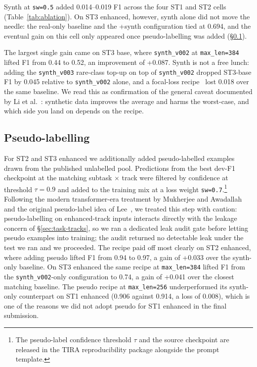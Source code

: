 Synth at \texttt{sw=0.5} added 0.014--0.019 F1 across the four ST1 and ST2 cells (Table~\ref{tab:ablation}). %
On ST3 enhanced, however, synth alone did not move the needle: the real-only baseline and the +synth configuration tied at 0.694, and the eventual gain on this cell only appeared once pseudo-labelling was added (\S\ref{sec:pseudo}). %

The largest single gain came on ST3 base, where \texttt{synth\_v002} at \texttt{max\_len=384} lifted F1 from 0.44 to 0.52, an improvement of +0.087. %
Synth is not a free lunch: adding the \texttt{synth\_v003} rare-class top-up on top of \texttt{synth\_v002} dropped ST3-base F1 by 0.045 relative to \texttt{synth\_v002} alone, and a focal-loss recipe~\cite{lin2017focal} lost 0.018 over the same baseline. %
We read this as confirmation of the general caveat documented by Li et al.~\cite{li2023synthdata}: synthetic data improves the average and harms the worst-case, and which side you land on depends on the recipe.

\subsection{Pseudo-labelling}
\label{sec:pseudo}

For ST2 and ST3 enhanced we additionally added pseudo-labelled examples drawn from the published unlabelled pool. Predictions from the best dev-F1 checkpoint at the matching subtask $\times$ track were filtered by confidence at threshold $\tau=0.9$ and added to the training mix at a loss weight \texttt{sw=0.7}.\footnote{The pseudo-label confidence threshold $\tau$ and the source checkpoint are released in the TIRA reproducibility package alongside the prompt template.} Following the modern transformer-era treatment by Mukherjee and Awadallah~\cite{mukherjee2020ust} and the original pseudo-label idea of Lee~\cite{lee2013pseudolabel}, we treated this step with caution: pseudo-labelling on enhanced-track inputs interacts directly with the leakage concern of \S\ref{sec:task-tracks}, so we ran a dedicated leak audit gate before letting pseudo examples into training; the audit returned no detectable leak under the test we ran and we proceeded. %
The recipe paid off most clearly on ST2 enhanced, where adding pseudo lifted F1 from 0.94 to 0.97, a gain of +0.033 over the synth-only baseline. %
On ST3 enhanced the same recipe at \texttt{max\_len=384} lifted F1 from the \texttt{synth\_v002}-only configuration to 0.74, a gain of +0.041 over the closest matching baseline. %
The pseudo recipe at \texttt{max\_len=256} underperformed its synth-only counterpart on ST1 enhanced (0.906 against 0.914, a loss of 0.008), %
which is one of the reasons we did not adopt pseudo for ST1 enhanced in the final submission.

